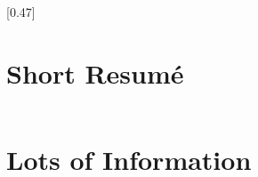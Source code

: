 \documentclass{modernsimplecv}
\newlength{\leftcolwidth}
\begin{document}
\setlength{\columnsep}{1.5cm}
[0.47]
\begin{paracol}{2}

\paracolbackgroundoptions



\footnotesize
{

\small
\section*{Short Resumé}

\begin{minipage}[t]{\leftcolwidth}
\begin{tabular}{r| p{} c}
\end{tabular}

\vspace{4em}

\small
\section*{Lots of Information}

\begin{tabular}{r| p{} c}
\end{tabular}

\vspace{4em}
\end{minipage}

\begin{minipage}[t]{\leftcolwidth}

\end{minipage}}
\end{paracol}
\end{document}
